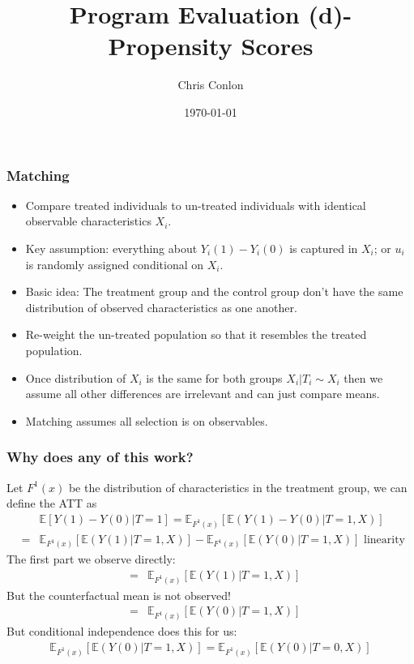 \documentclass[xcolor=pdftex,dvipsnames,table,mathserif,aspectratio=169]{beamer}
\begin{document}
\title{Program Evaluation (d)- Propensity Scores}
\author{Chris Conlon}
\date{\today}

\frame{\titlepage}


\begin{frame}
\frametitle{Matching}
\begin{itemize}
\item Compare treated individuals to un-treated individuals with identical observable characteristics $X_i$.
\item Key assumption: everything about $Y_i(1) - Y_i(0)$ is captured in $X_i$; or $u_i$ is randomly assigned conditional on $X_i$.
\item Basic idea: The treatment group and the control group don't have the same distribution of observed characteristics as one another. 
\item \alert{Re-weight} the un-treated population so that it resembles the treated population.
\item Once distribution of $X_i$ is the same for both groups $ X_i | T_i \sim X_i$ then we assume all other differences are irrelevant and can just compare means.
\item Matching assumes \alert{all selection is on observables}.
\end{itemize}
\end{frame}



\begin{frame}
\frametitle{Why does any of this work?}
\small
Let  $F^{1}(x)$ be the distribution of characteristics in the treatment group, we can define the ATT as 
\begin{eqnarray*}
&&\mathbb{E}[Y(1) - Y(0) | T =1] =\mathbb{E}_{F^1(x)} \left[\mathbb{E}(Y(1) -Y(0) | T=1,X) \right] \\
&=&  \mathbb{E}_{F^1(x)} [\mathbb{E}(Y(1) | T=1,X)] -  \mathbb{E}_{F^1(x)} [\mathbb{E}(Y(0) | T=1,X)] \mbox{ linearity } 
\end{eqnarray*}
The first part we observe directly:
\begin{eqnarray*}
&=&  \mathbb{E}_{F^1(x)} [\mathbb{E}(Y(1) | T=1,X)] 
\end{eqnarray*}
But the counterfactual mean is not observed!
\begin{eqnarray*}
&=&  \mathbb{E}_{F^1(x)} [\mathbb{E}(Y(0) | T=1,X)] 
\end{eqnarray*}
But conditional independence does this for us:
\begin{eqnarray*}
 \mathbb{E}_{F^1(x)} [\mathbb{E}(Y(0) | T=1,X)]  =  \mathbb{E}_{F^1(x)} [\mathbb{E}(Y(0) | T=0,X)] 
\end{eqnarray*}
\end{frame}
\end{document}
